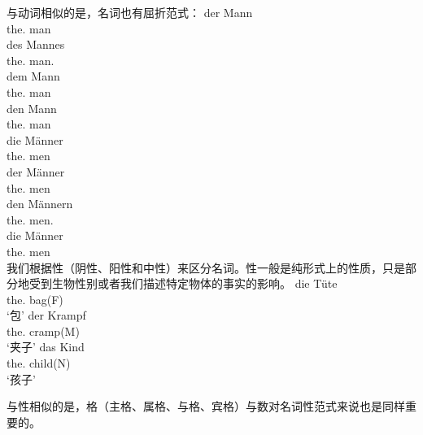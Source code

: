 与动词相似的是，名词也有屈折范式：
\eal
\ex 
\gll der Mann\\
	 the.\nom{} man\\
\ex 
\gll des Mannes\\
	 the.\gen{} man.\gen{}\\
\ex 
\gll dem Mann\\
	 the.\dat{} man\\
\ex 
\gll den Mann\\
	 the.\acc{} man\\
\ex 
\gll die Männer\\
	 the.\nom{} men\\
\ex 
\gll der Männer\\
	 the.\gen{} men\\
\ex 
\gll den Männern\\
	 the.\dat{} men.\dat\\
\ex 
\gll die Männer\\
	 the.\acc{} men\\
\zl
我们根据性（阴性、阳性和中性）来区分名词。性一般是纯形式上的性质，只是部分地受到生物性别或者我们描述特定物体的事实的影响。
\eal
\ex
\gll die Tüte\\
	 the.\fem{} bag(F)\\
\glt `包'
\ex 
\gll der Krampf\\
	 the.\mas{} cramp(M)\\
\glt `夹子'
\ex 
\gll das Kind\\
	 the.\neu{} child(N)\\
\glt `孩子'
\zl

与性相似的是，格（主格、属格、与格、宾格）与数对名词性范式来说也是同样重要的。

